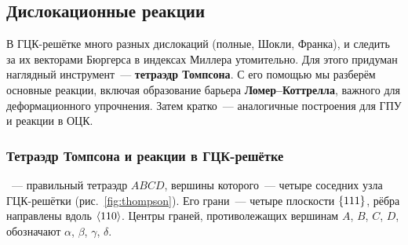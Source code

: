 \subsection{Дислокационные реакции}\label{ssec:disl-reactions}

\begin{orientir}
В ГЦК-решётке много разных дислокаций (полные, Шокли, Франка), и
следить за их векторами Бюргерса в индексах Миллера утомительно. Для
этого придуман наглядный инструмент~— \textbf{тетраэдр Томпсона}. С его
помощью мы разберём основные реакции, включая образование барьера
\textbf{Ломер--Коттрелла}, важного для деформационного упрочнения. Затем
кратко~— аналогичные построения для ГПУ и реакции в ОЦК.
\end{orientir}

\subsubsection{Тетраэдр Томпсона и реакции в ГЦК-решётке}

\begin{opredelenie}
~— правильный тетраэдр $ABCD$,
вершины которого~— четыре соседних узла ГЦК-решётки
(рис.~\ref{fig:thompson}). Его грани~— четыре плоскости $\{111\}$,
рёбра направлены вдоль $\langle 110\rangle$. Центры граней, противолежащих
вершинам $A$, $B$, $C$, $D$, обозначают $\alpha$, $\beta$, $\gamma$,
$\delta$.
\end{opredelenie}

